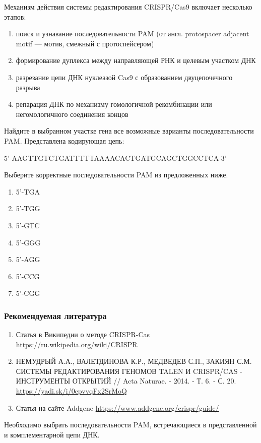 
Механизм действия системы редактирования CRISPR/Cas9 включает несколько этапов:

\begin{enumerate}
    \item поиск и узнавание последовательности PAM (от англ. protospacer adjacent motif — мотив, смежный с протоспейсером)
    \item формирование дуплекса между направляющей РНК и целевым участком ДНК
    \item разрезание цепи ДНК нуклеазой Cas9 с образованием двуцепочечного разрыва
    \item репарация ДНК по механизму гомологичной рекомбинации или негомологичного соединения концов
\end{enumerate}

Найдите в выбранном участке гена все возможные варианты последовательности PAM. Представлена кодирующая цепь:

5'-AAGTTGTCTGATTTTTAAAACACTGATGCAGCTGGCCTCA-3'

Выберите корректные последовательности PAM из предложенных ниже.

\begin{enumerate}
    \item 5'-TGA
    \item 5'-TGG
    \item 5'-GTC
    \item 5'-GGG
    \item 5'-AGG
    \item 5'-CCG
    \item 5'-CGG
\end{enumerate}

\subsubsection*{Рекомендуемая литература}

\begin{enumerate}
    \item Статья в Википедии о методе CRISPR-Cas \url{https://ru.wikipedia.org/wiki/CRISPR}
    \item НЕМУДРЫЙ А.А., ВАЛЕТДИНОВА К.Р., МЕДВЕДЕВ С.П., ЗАКИЯН С.М. СИСТЕМЫ РЕДАКТИРОВАНИЯ ГЕНОМОВ TALEN И CRISPR/CAS - ИНСТРУМЕНТЫ ОТКРЫТИЙ // Acta Naturae. - 2014. - Т. 6. - С. 20.  \url{https://yadi.sk/i/0epvvqFx2SrMoQ}
    \item Статья на сайте Addgene \url{https://www.addgene.org/crispr/guide/}
\end{enumerate}

\explanationSection

Необходимо выбрать последовательности PAM, встречающиеся в представленной и комплементарной цепи ДНК.

